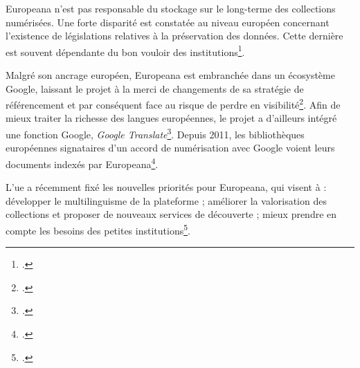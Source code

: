 Europeana n'est pas responsable du stockage sur le long-terme des collections numérisées. Une forte disparité est constatée au niveau européen concernant l'existence de législations relatives à la préservation des données. Cette dernière est souvent dépendante du bon vouloir des institutions\footcite{noauthor_european_2019}.

Malgré son ancrage européen, Europeana est embranchée dans un écosystème Google, laissant le projet à la merci de changements de sa stratégie de référencement et par conséquent face au risque de perdre en visibilité\footcite{thylstrup_politics_2018}. Afin de mieux traiter la richesse des langues européennes, le projet a d'ailleurs intégré une fonction Google, \textit{Google Translate}\footcite{thelle_persuasive_2011}. Depuis 2011, les bibliothèques européennes signataires d'un accord de numérisation avec Google voient leurs documents indexés par Europeana\footcite{moatti_bibliotheque_2012}.

L'\gls{ue} a récemment fixé les nouvelles priorités pour Europeana, qui visent à : développer le multilinguisme de la plateforme ; améliorer la valorisation des collections et proposer de nouveaux services de découverte ; mieux prendre en compte les besoins des petites institutions\footcite{noauthor_european_2019}.

